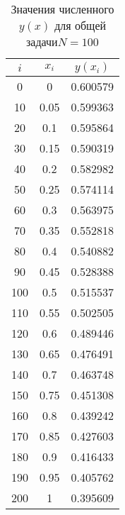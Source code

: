 \documentclass[a4paper,12pt,titlepage]{article}
\begin{document}
\begin{table}[h]
\centering
\begin{tabular}{|c|c|c|}
\hline
$i$ & $x_i$ & $y(x_i)$ \\
\hline
0&0&0.600579\\
10&0.05&0.599363\\
20&0.1&0.595864\\
30&0.15&0.590319\\
40&0.2&0.582982\\
50&0.25&0.574114\\
60&0.3&0.563975\\
70&0.35&0.552818\\
80&0.4&0.540882\\
90&0.45&0.528388\\
100&0.5&0.515537\\
110&0.55&0.502505\\
120&0.6&0.489446\\
130&0.65&0.476491\\
140&0.7&0.463748\\
150&0.75&0.451308\\
160&0.8&0.439242\\
170&0.85&0.427603\\
180&0.9&0.416433\\
190&0.95&0.405762\\
200&1&0.395609\\
\hline
\end{tabular}
\caption{Значения численного $y(x)$ для общей задачи $N=100$}
\label{table}
\end{table}

\newpage
\end{document}
